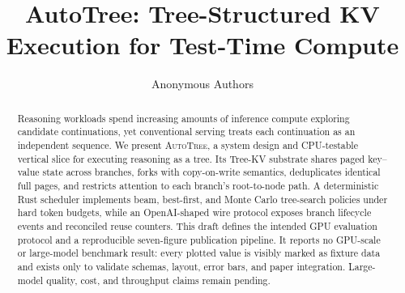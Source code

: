 \documentclass[10pt,twocolumn]{article}
\title{AutoTree: Tree-Structured KV Execution for Test-Time Compute}
\author{Anonymous Authors}
\date{}
\newcommand{\system}{\textsc{AutoTree}}
\begin{document}
\maketitle

\begin{abstract}
Reasoning workloads spend increasing amounts of inference compute exploring
candidate continuations, yet conventional serving treats each continuation as
an independent sequence.  We present \system, a system design and CPU-testable
vertical slice for executing reasoning as a tree.  Its Tree-KV substrate shares
paged key--value state across branches, forks with copy-on-write semantics,
deduplicates identical full pages, and restricts attention to each branch's
root-to-node path.  A deterministic Rust scheduler implements beam,
best-first, and Monte Carlo tree-search policies under hard token budgets, while
an OpenAI-shaped wire protocol exposes branch lifecycle events and reconciled
reuse counters.  This draft defines the intended GPU evaluation protocol and a
reproducible seven-figure publication pipeline.  It reports no GPU-scale or
large-model benchmark result: every plotted value is visibly marked as fixture
data and exists only to validate schemas, layout, error bars, and paper
integration.  Large-model quality, cost, and throughput claims remain pending.
\end{abstract}











\end{document}

